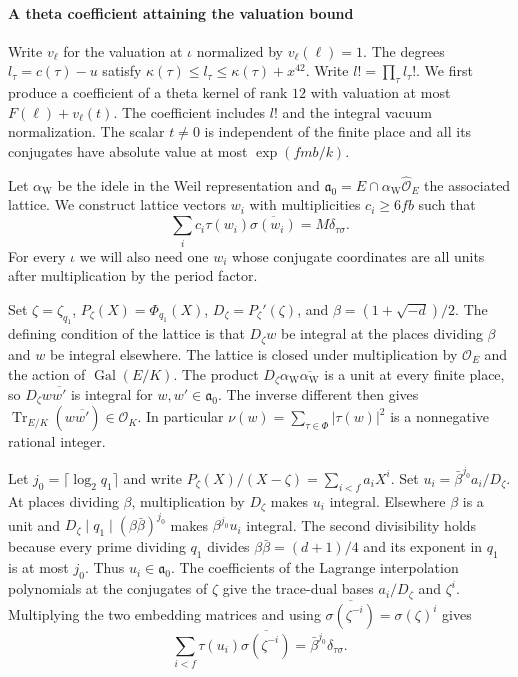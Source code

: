 \paragraph{A theta coefficient attaining the valuation bound}
Write \(v_\ell\) for the valuation at \(\iota\) normalized by \(v_\ell(\ell)=1\).
The degrees \(l_\tau=c(\tau)-u\) satisfy
\(\kappa(\tau)\le l_\tau\le\kappa(\tau)+x^{42}\). Write \(l!=\prod_\tau l_\tau!\).
We first produce a coefficient of a theta kernel of rank \(12\) with valuation at
most \(F(\ell)+v_\ell(t)\). The coefficient includes \(l!\) and the integral
vacuum normalization. The scalar \(t\ne0\) is independent of the finite place
and all its conjugates have absolute value at most \(\exp(fmb/k)\).

Let \(\alpha_\mathrm{W}\) be the idele in the Weil representation and
\(\mathfrak a_0=E\cap\alpha_\mathrm{W}\widehat{\mathcal O}_E\) the associated lattice.
We construct lattice vectors \(w_i\) with multiplicities \(c_i\ge6fb\) such that
\begin{equation}\label{eq:attain-frame}
 \sum_i c_i\tau(w_i)\overline{\sigma(w_i)}=M\delta_{\tau\sigma}.
\end{equation}
For every \(\iota\) we will also need one \(w_i\) whose conjugate coordinates are
all units after multiplication by the period factor.

Set \(\zeta=\zeta_{q_1}\), \(P_\zeta(X)=\Phi_{q_1}(X)\),
\(D_\zeta=P_\zeta'(\zeta)\), and \(\beta=(1+\sqrt{-d})/2\).
The defining condition of the lattice is that \(D_\zeta w\) be integral at
the places dividing \(\beta\) and \(w\) be integral elsewhere.
The lattice is closed under multiplication by \(\mathcal O_E\) and the
action of \(\operatorname{Gal}(E/K)\).
The product \(D_\zeta\alpha_\mathrm{W}\overline{\alpha_\mathrm{W}}\) is a unit at
every finite place, so \(D_\zeta w\overline{w'}\) is integral for
\(w,w'\in\mathfrak a_0\). The inverse different then gives
\(\operatorname{Tr}_{E/K}(w\overline{w'})\in\mathcal O_K\).
In particular \(\nu(w)=\sum_{\tau\in\Phi}|\tau(w)|^2\) is a nonnegative
rational integer.

Let \(j_0=\lceil\log_2 q_1\rceil\) and write
\(P_\zeta(X)/(X-\zeta)=\sum_{i<f}a_iX^i\).
Set \(u_i=\bar\beta^{j_0}a_i/D_\zeta\).
At places dividing \(\beta\), multiplication by \(D_\zeta\) makes \(u_i\)
integral. Elsewhere \(\beta\) is a unit and
\(D_\zeta\mid q_1\mid(\beta\bar\beta)^{j_0}\) makes
\(\beta^{j_0}u_i\) integral. The second divisibility holds because every prime
dividing \(q_1\) divides \(\beta\bar\beta=(d+1)/4\) and its exponent in \(q_1\)
is at most \(j_0\). Thus \(u_i\in\mathfrak a_0\).
The coefficients of the Lagrange interpolation polynomials at the
conjugates of \(\zeta\) give the trace-dual bases \(a_i/D_\zeta\) and
\(\zeta^i\). Multiplying the two embedding matrices and using
\(\overline{\sigma(\zeta^{-i})}=\sigma(\zeta)^i\) gives
\[
 \sum_{i<f}\tau(u_i)\overline{\sigma(\zeta^{-i})}
     =\bar\beta^{j_0}\delta_{\tau\sigma}.
\]

